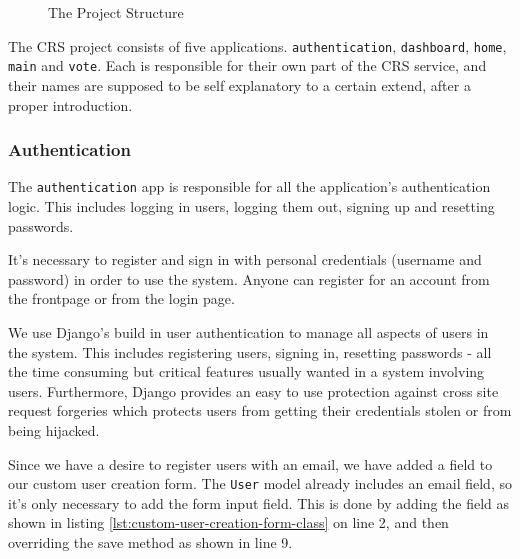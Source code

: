 \begin{figure}[H]
    \caption{The Project Structure}
    \label{fig:project-structure}
\end{figure}

The CRS project consists of five applications. \texttt{authentication}, \texttt{dashboard}, \texttt{home}, \texttt{main} and \texttt{vote}. Each is responsible for their own part of the CRS service, and their names are supposed to be self explanatory to a certain extend, after a proper introduction.

\subsubsection*{Authentication}
The \texttt{authentication} app is responsible for all the application's authentication logic. This includes logging in users, logging them out, signing up and resetting passwords.

It's necessary to register and sign in with personal credentials (username and password) in order to use the system. Anyone can register for an account from the frontpage or from the login page.

We use Django's build in user authentication to manage all aspects of users in the system. This includes registering users, signing in, resetting passwords - all the time consuming but critical features usually wanted in a system involving users. Furthermore, Django provides an easy to use protection against cross site request forgeries which protects users from getting their credentials stolen or from being hijacked. 

Since we have a desire to register users with an email, we have added a field to our custom user creation form. The \texttt{User} model already includes an email field, so it's only necessary to add the form input field. This is done by adding the field as shown in listing \ref{lst:custom-user-creation-form-class} on line 2, and then overriding the save method as shown in line 9.


